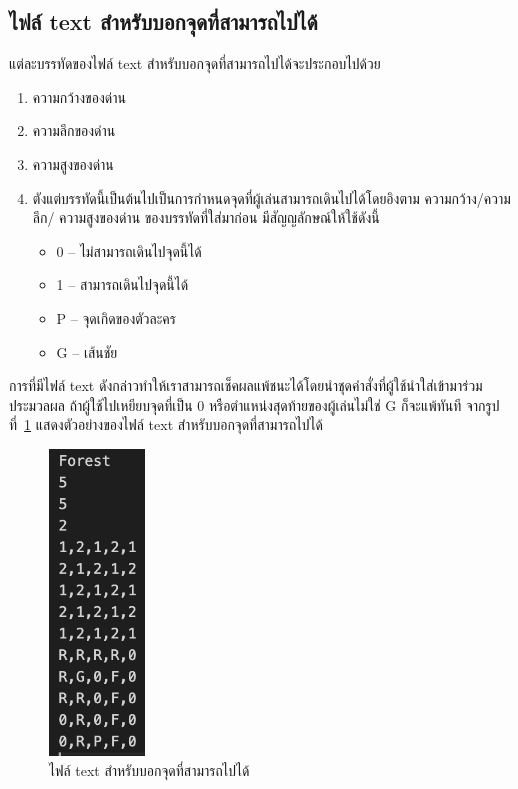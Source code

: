 \subsection{ไฟล์ text สำหรับบอกจุดที่สามารถไปได้}
แต่ละบรรทัดของไฟล์ text สำหรับบอกจุดที่สามารถไปได้จะประกอบไปด้วย
\begin{enumerate}
    \item ความกว้างของด่าน
    \item ความลึกของด่าน
    \item ความสูงของด่าน
    \item ตังแต่บรรทัดนี้เป็นต้นไปเป็นการกำหนดจุดที่ผู้เล่นสามารถเดินไปได้โดยอิงตาม ความกว้าง/ความลึก/ \newline ความสูงของด่าน ของบรรทัดที่ใส่มาก่อน มีสัญญลักษณ์ให้ใช้ดังนี้
    \begin{itemize}
        \item 0 -- ไม่สามารถเดินไปจุดนี้ได้
        \item 1 -- สามารถเดินไปจุดนี้ได้
        \item P -- จุดเกิดของตัวละคร
        \item G -- เส้นชัย
    \end{itemize}
\end{enumerate}
การที่มีไฟล์ text ดังกล่าวทำให้เราสามารถเช็คผลแพ้ชนะได้โดยนำชุดคำสั่งที่ผู้ใช้นำใส่เข้ามาร่วมประมวลผล ถ้าผู้ใช้ไปเหยียบจุดที่เป็น 0
หรือตำแหน่งสุดท้ายของผู้เล่นไม่ใช่ G ก็จะแพ้ทันที จากรูปที่~\ref{ft2} แสดงตัวอย่างของไฟล์ text สำหรับบอกจุดที่สามารถไปได้
\begin{figure}[h!]
    \begin{center}
    \includegraphics[width=1in]{pic-toro/filetext2.png}
    \end{center}
    \caption[ไฟล์ text สำหรับบอกจุดที่สามารถไปได้]{ไฟล์ text สำหรับบอกจุดที่สามารถไปได้}
    \label{ft2}
    \end{figure}

